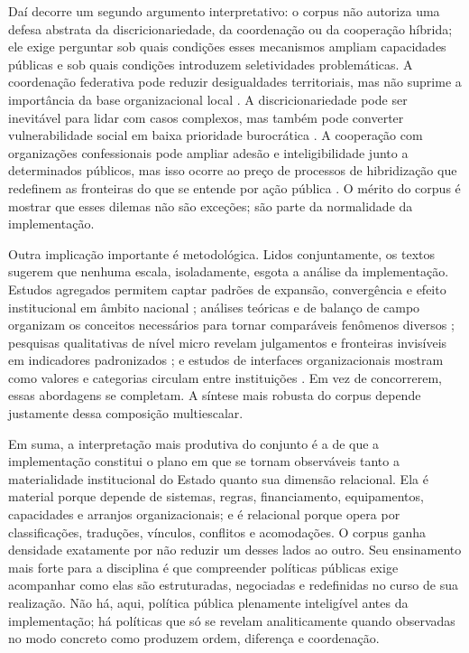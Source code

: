 \documentclass[12pt,a4paper]{article}
\begin{document}
Daí decorre um segundo argumento interpretativo: o corpus não autoriza uma defesa abstrata da discricionariedade, da coordenação ou da cooperação híbrida; ele exige perguntar sob quais condições esses mecanismos ampliam capacidades públicas e sob quais condições introduzem seletividades problemáticas. A coordenação federativa pode reduzir desigualdades territoriais, mas não suprime a importância da base organizacional local \parencite{bichir2020_sistemas_nacionais}. A discricionariedade pode ser inevitável para lidar com casos complexos, mas também pode converter vulnerabilidade social em baixa prioridade burocrática \parencite{lotta2020_categorizando_usuarios}. A cooperação com organizações confessionais pode ampliar adesão e inteligibilidade junto a determinados públicos, mas isso ocorre ao preço de processos de hibridização que redefinem as fronteiras do que se entende por ação pública \parencite{lotta2023_jesus_speaks}. O mérito do corpus é mostrar que esses dilemas não são exceções; são parte da normalidade da implementação.

Outra implicação importante é metodológica. Lidos conjuntamente, os textos sugerem que nenhuma escala, isoladamente, esgota a análise da implementação. Estudos agregados permitem captar padrões de expansão, convergência e efeito institucional em âmbito nacional \parencite{bichir2020_sistemas_nacionais}; análises teóricas e de balanço de campo organizam os conceitos necessários para tornar comparáveis fenômenos diversos \parencite{lotta2019_teorias_analises}; pesquisas qualitativas de nível micro revelam julgamentos e fronteiras invisíveis em indicadores padronizados \parencite{lotta2020_categorizando_usuarios}; e estudos de interfaces organizacionais mostram como valores e categorias circulam entre instituições \parencite{lotta2023_jesus_speaks}. Em vez de concorrerem, essas abordagens se completam. A síntese mais robusta do corpus depende justamente dessa composição multiescalar.

Em suma, a interpretação mais produtiva do conjunto é a de que a implementação constitui o plano em que se tornam observáveis tanto a materialidade institucional do Estado quanto sua dimensão relacional. Ela é material porque depende de sistemas, regras, financiamento, equipamentos, capacidades e arranjos organizacionais; e é relacional porque opera por classificações, traduções, vínculos, conflitos e acomodações. O corpus ganha densidade exatamente por não reduzir um desses lados ao outro. Seu ensinamento mais forte para a disciplina é que compreender políticas públicas exige acompanhar como elas são estruturadas, negociadas e redefinidas no curso de sua realização. Não há, aqui, política pública plenamente inteligível antes da implementação; há políticas que só se revelam analiticamente quando observadas no modo concreto como produzem ordem, diferença e coordenação.
\end{document}
